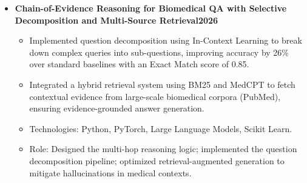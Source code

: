 \documentclass[11pt,a4paper]{article}
\newcommand{\smaller}{\small}
\newcommand{\heading}[2]{
  \noindent#1\hfill{\color{cvtextgray}#2}\\
}
\newcommand{\headingBf}[2]{
  \heading{\textbf{#1}}{\textbf{#2}}
}
\begin{document}
\begin{itemize}[label={\smaller$\bullet$}]
 \item \headingBf{Chain-of-Evidence Reasoning for Biomedical QA with Selective Decomposition and Multi-Source Retrieval}{2026}
    \begin{itemize}[label={\smaller$\diamond$}] 
    
    \item Implemented question decomposition using In-Context Learning to break down complex queries into sub-questions, improving accuracy by 26\% over standard baselines with an Exact Match score of 0.85.

    \item Integrated a hybrid retrieval system using BM25 and MedCPT to fetch contextual evidence from large-scale biomedical corpora (PubMed), ensuring evidence-grounded answer generation. 
    \item Technologies: Python, PyTorch, Large Language Models, Scikit Learn. 
    \item Role: Designed the multi-hop reasoning logic; implemented the question decomposition pipeline; optimized retrieval-augmented generation to mitigate hallucinations in medical contexts. 
    \end{itemize}

    
\end{itemize}
\end{document}
